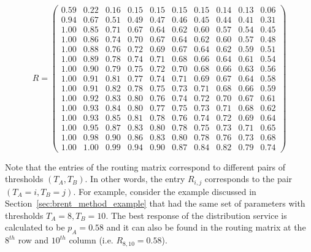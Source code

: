\begin{equation*}
    R =
    \begin{pmatrix}
        0.59 & 0.22 & 0.16 & 0.15 & 0.15 & 0.15 & 0.15 & 0.14 & 0.13 & 0.06 \\
        0.94 & 0.67 & 0.51 & 0.49 & 0.47 & 0.46 & 0.45 & 0.44 & 0.41 & 0.31 \\
        1.00 & 0.85 & 0.71 & 0.67 & 0.64 & 0.62 & 0.60 & 0.57 & 0.54 & 0.45 \\
        1.00 & 0.86 & 0.74 & 0.70 & 0.67 & 0.64 & 0.62 & 0.60 & 0.57 & 0.48 \\
        1.00 & 0.88 & 0.76 & 0.72 & 0.69 & 0.67 & 0.64 & 0.62 & 0.59 & 0.51 \\
        1.00 & 0.89 & 0.78 & 0.74 & 0.71 & 0.68 & 0.66 & 0.64 & 0.61 & 0.54 \\
        1.00 & 0.90 & 0.79 & 0.75 & 0.72 & 0.70 & 0.68 & 0.66 & 0.63 & 0.56 \\
        1.00 & 0.91 & 0.81 & 0.77 & 0.74 & 0.71 & 0.69 & 0.67 & 0.64 & 0.58 \\
        1.00 & 0.91 & 0.82 & 0.78 & 0.75 & 0.73 & 0.71 & 0.68 & 0.66 & 0.59 \\
        1.00 & 0.92 & 0.83 & 0.80 & 0.76 & 0.74 & 0.72 & 0.70 & 0.67 & 0.61 \\
        1.00 & 0.93 & 0.84 & 0.80 & 0.77 & 0.75 & 0.73 & 0.71 & 0.68 & 0.62 \\
        1.00 & 0.93 & 0.85 & 0.81 & 0.78 & 0.76 & 0.74 & 0.72 & 0.69 & 0.64 \\
        1.00 & 0.95 & 0.87 & 0.83 & 0.80 & 0.78 & 0.75 & 0.73 & 0.71 & 0.65 \\
        1.00 & 0.98 & 0.90 & 0.86 & 0.83 & 0.80 & 0.78 & 0.76 & 0.73 & 0.68 \\
        1.00 & 1.00 & 0.99 & 0.94 & 0.90 & 0.87 & 0.84 & 0.82 & 0.79 & 0.74
    \end{pmatrix}    
\end{equation*}

Note that the entries of the routing matrix correspond to different pairs of
thresholds \((T_A, T_B)\).
In other words, the entry \(R_{i,j}\) corresponds to the pair \((T_A=i,T_B=j)\).
For example, consider the example discussed in
Section~\ref{sec:brent_method_example} that had the same set of parameters with
thresholds \(T_A=8, T_B=10\).
The best response of the distribution service is calculated to be \(p_A=0.58\)
and it can also be found in the routing matrix at the \(8^{th}\) row and
\(10^{th}\) column (i.e. \(R_{8,10} = 0.58\)).


